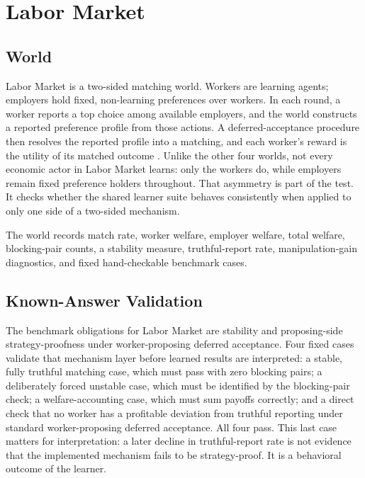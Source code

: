 \documentclass[11pt]{article}
\begin{document}
\section{Labor Market}

\subsection{World}

Labor Market is a two-sided matching world. Workers are learning agents;
employers hold fixed, non-learning preferences over workers. In each round, a
worker reports a top choice among available employers, and the world constructs
a reported preference profile from those actions. A deferred-acceptance
procedure then resolves the reported profile into a matching, and each worker's
reward is the utility of its matched outcome \citep{galeshapley1962,rothsotomayor1990}.
Unlike the other four worlds, not every economic actor in Labor Market learns:
only the workers do, while employers remain fixed preference holders throughout.
That asymmetry is part of the test. It checks whether the shared learner suite
behaves consistently when applied to only one side of a two-sided mechanism.

The world records match rate, worker welfare, employer welfare, total welfare,
blocking-pair counts, a stability measure, truthful-report rate,
manipulation-gain diagnostics, and fixed hand-checkable benchmark cases.

\subsection{Known-Answer Validation}

The benchmark obligations for Labor Market are stability and proposing-side
strategy-proofness under worker-proposing deferred acceptance. Four fixed cases
validate that mechanism layer before learned results are interpreted: a stable,
fully truthful matching case, which must pass with zero blocking pairs; a
deliberately forced unstable case, which must be identified by the blocking-pair
check; a welfare-accounting case, which must sum payoffs correctly; and a direct
check that no worker has a profitable deviation from truthful reporting under
standard worker-proposing deferred acceptance. All four pass. This last case
matters for interpretation: a later decline in truthful-report rate is not
evidence that the implemented mechanism fails to be strategy-proof. It is a
behavioral outcome of the learner.
\end{document}
